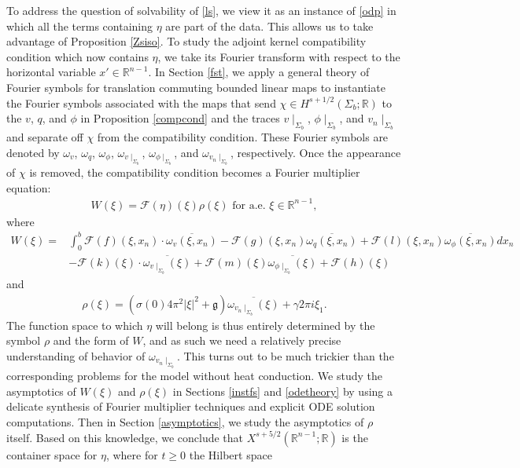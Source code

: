 \documentclass[11pt,letterpaper,reqno]{amsart}
\numberwithin{equation}{section}
\newcommand{\abs}[1]{\left\lvert#1\right\rvert}
\begin{document}
To address the question of solvability of \eqref{ls}, we view it as an instance of \eqref{odp} in which all the terms containing \(\eta\) are part of the data. This allows us to take advantage of Proposition \ref{Zsiso}. To study the adjoint kernel compatibility condition which now contains \(\eta\), we take its Fourier transform with respect to the horizontal variable \(x' \in \mathbb{R}^{n-1}\). In Section \ref{fst}, we apply a general theory of Fourier symbols for translation commuting bounded linear maps to instantiate the Fourier symbols associated with the maps that send \(\chi \in H^{s+1/2}(\Sigma_{b};\mathbb{R})\) to the \(v\), \(q\), and \(\phi\) in Proposition \ref{compcond} and the traces \(v \mid_{\Sigma_{b}}\), \(\phi\mid_{\Sigma_{b}}\), and \(v_{n}\mid_{\Sigma_{b}}\) and separate off \(\chi\) from the compatibility condition. These Fourier symbols are denoted by \(\omega_{v}\), \(\omega_{q}\), \(\omega_{\phi}\), \(\omega_{v\mid_{\Sigma_{b}}}\), \(\omega_{\phi\mid_{\Sigma_{b}}}\), and \(\omega_{v_{n}\mid_{\Sigma_{b}}}\), respectively. Once the appearance of \(\chi\) is removed, the compatibility condition becomes a Fourier multiplier equation:
\begin{align} \label{wfer}
    \mbox{\(W(\xi)=\mathcal{F}(\eta)(\xi)\rho(\xi)\) for a.e. \(\xi \in \mathbb{R}^{n-1}\)},
\end{align}
where
\begin{align}
    W(\xi)=&\int_{0}^{b}\mathcal{F}(f)(\xi,x_{n})\cdot \overline{\omega_{v}(\xi,x_{n})}-\mathcal{F}(g)(\xi,x_{n})\overline{\omega_{q}(\xi,x_{n})}+\mathcal{F}(l)(\xi,x_{n})\overline{\omega_{\phi}(\xi,x_{n})}dx_{n} \nonumber\\
    &-\mathcal{F}(k)(\xi)\cdot\overline{\omega_{v\mid_{\Sigma_{b}}}(\xi)}+\mathcal{F}(m)(\xi)\overline{\omega_{\phi\mid_{\Sigma_{b}}}(\xi)}+\mathcal{F}(h)(\xi)
\end{align}
and
\begin{align}
    \rho(\xi)=(\sigma(0)4\pi^{2}\abs{\xi}^{2}+\mathfrak{g})\overline{\omega_{v_{n}\mid_{\Sigma_{b}}}(\xi)}+\gamma 2\pi i \xi_{1}.
\end{align}
The function space to which $\eta$ will belong is thus entirely determined by the symbol $\rho$ and the form of $W$, and as such we need a relatively precise understanding of behavior of $\omega_{v_{n}\mid_{\Sigma_{b}}}$.  This turns out to be much trickier than the corresponding problems for the model without heat conduction.  We study the asymptotics of  \(W(\xi)\) and \(\rho(\xi)\) in Sections \ref{instfs} and \ref{odetheory} by using a delicate synthesis of Fourier multiplier techniques and explicit ODE solution computations.  Then in Section \ref{asymptotics}, we study the asymptotics of \(\rho\) itself. Based on this knowledge, we conclude that \(X^{s+5/2}(\mathbb{R}^{n-1};\mathbb{R})\) is the container space for \(\eta\), where for $t \ge 0$ the Hilbert space
\end{document}

